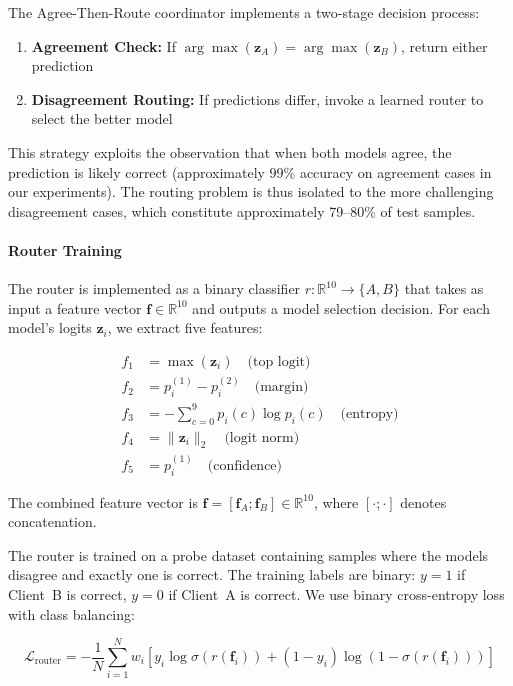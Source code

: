 \documentclass[12pt]{article}
\begin{document}
The Agree-Then-Route coordinator implements a two-stage decision process:

\begin{enumerate}
    \item \textbf{Agreement Check:} If $\arg\max(\mathbf{z}_A) = \arg\max(\mathbf{z}_B)$, return either prediction
    \item \textbf{Disagreement Routing:} If predictions differ, invoke a learned router to select the better model
\end{enumerate}

This strategy exploits the observation that when both models agree, the prediction is likely correct (approximately 99\% accuracy on agreement cases in our experiments). The routing problem is thus isolated to the more challenging disagreement cases, which constitute approximately 79--80\% of test samples.

\paragraph{Router Training}

The router is implemented as a binary classifier $r: \mathbb{R}^{10} \rightarrow \{A, B\}$ that takes as input a feature vector $\mathbf{f} \in \mathbb{R}^{10}$ and outputs a model selection decision. For each model's logits $\mathbf{z}_i$, we extract five features:

\begin{align}
f_1 &= \max(\mathbf{z}_i) \quad \text{(top logit)} \\
f_2 &= p_i^{(1)} - p_i^{(2)} \quad \text{(margin)} \\
f_3 &= -\sum_{c=0}^{9} p_i(c) \log p_i(c) \quad \text{(entropy)} \\
f_4 &= \|\mathbf{z}_i\|_2 \quad \text{(logit norm)} \\
f_5 &= p_i^{(1)} \quad \text{(confidence)}
\end{align}

The combined feature vector is $\mathbf{f} = [\mathbf{f}_A; \mathbf{f}_B] \in \mathbb{R}^{10}$, where $[\cdot; \cdot]$ denotes concatenation.

The router is trained on a probe dataset containing samples where the models disagree and exactly one is correct. The training labels are binary: $y=1$ if Client~B is correct, $y=0$ if Client~A is correct. We use binary cross-entropy loss with class balancing:

\begin{equation}
\mathcal{L}_{\text{router}} = -\frac{1}{N}\sum_{i=1}^{N} w_i \left[y_i \log \sigma(r(\mathbf{f}_i)) + (1-y_i) \log(1-\sigma(r(\mathbf{f}_i)))\right]
\end{equation}
\end{document}
